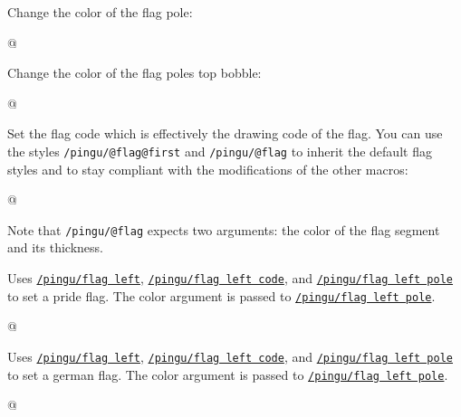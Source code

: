 \documentclass[parskip=half,english,numbers=noenddot,footnotes=nomultiple,oneside]{scrartcl}
\def\lpingu#1{\lstinline[style=lstpingu,language=pingulang]'#1'}
\newcommand*\keyref[2][/pingu/]{\hyperref[pk:#1#2]{\lpingu{#1#2}}}
\begin{document}
Change the color of the flag pole:
	\begin{tcblisting}{@}
\begin{tikzpicture}
	\pingu[flag left, flag left pole=green]
\end{tikzpicture}
\end{tcblisting}
\endsubkeyexplain

Change the color of the flag poles top bobble:
	\begin{tcblisting}{@}
\begin{tikzpicture}
	\pingu[flag left, flag left bobble=green]
\end{tikzpicture}
\end{tcblisting}
\endsubkeyexplain

Set the flag code which is effectively the drawing code of the flag.
You can use the styles \lpingu{/pingu/@flag@first} and \lpingu{/pingu/@flag} to inherit the default flag styles and to stay compliant with the modifications of the other macros:
	\begin{tcblisting}{@}
\begin{tikzpicture}
	\pingu[flag left, flag left code={
	  \node[/pingu/@flag@first,
	  	/pingu/@flag={blue}{5mm}]
	  		(upper) at (0,0) {};
	  \node[below,/pingu/@flag={black}{4mm}]
	  	(lower) at (upper.south) {};
	}]
\end{tikzpicture}
\end{tcblisting}
Note that \lpingu{/pingu/@flag} expects two arguments: the color of the flag segment and its thickness.
\endsubkeyexplain

	Uses \keyref{flag left}, \keyref{flag left code}, and \keyref{flag left pole} to set a pride flag. The color argument is passed to \keyref{flag left pole}.
\begin{tcblisting}{@}
\begin{tikzpicture}
	\pingu[pride flag left=green]
\end{tikzpicture}
\end{tcblisting}
\endkeyexplain


	Uses \keyref{flag left}, \keyref{flag left code}, and \keyref{flag left pole} to set a german flag. The color argument is passed to \keyref{flag left pole}.
\begin{tcblisting}{@}
\begin{tikzpicture}
	\pingu[german flag left=green]
\end{tikzpicture}
\end{tcblisting}
\endkeyexplain
\end{document}
